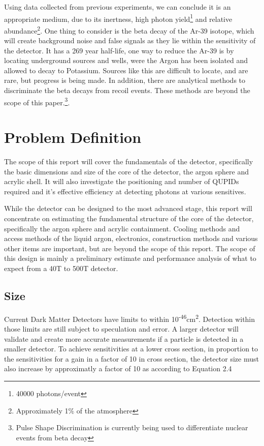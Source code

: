 \documentclass[11pt,a4paper,oneside]{report}
\begin{document}
Using data collected from previous experiments, we can conclude it is an appropriate medium, due to its inertness, high photon yield\footnote{40000 photons/event} and relative abundance\cite{16}\footnote{Approximately 1$\%$ of the atmosphere}. One thing to consider is the beta decay of the Ar-39 isotope, which will create background noise and false signals as they lie within the sensitivity of the detector. It has a 269 year half-life, one way to reduce the Ar-39 is by locating underground sources and wells, were the Argon has been isolated and allowed to decay to Potassium\cite{17}. Sources like this are difficult to locate, and are rare, but progress is being made. In addition, there are analytical methods to discriminate the beta decays from recoil events. These methods are beyond the scope of this paper.\footnote{Pulse Shape Discrimination is currently being used to differentiate nuclear events from beta decay}.


\newpage
\chapter{Problem Definition}

The scope of this report will cover the fundamentals of the detector, specifically the basic dimensions and size of the core of the detector, the argon sphere and acrylic shell. It will also investigate the positioning and number of QUPIDs required and it's effective efficiency at detecting photons at various sensitives.

While the detector can be designed to the most advanced stage, this report will concentrate on estimating the fundamental structure of the core of the detector, specifically the argon sphere and acrylic containment. Cooling methods and access methods of the liquid argon, electronics, construction methods and various other items are important, but are beyond the scope of this report. The scope of this design is mainly a preliminary estimate and performance analysis of what to expect from a 40T to 500T detector.

\section{Size}
Current Dark Matter Detectors have limits to within 10\textsuperscript{-46}cm\textsuperscript{2}. Detection within those limits are still subject to speculation and error. A larger detector will validate and create more accurate measurements if a particle is detected in a smaller detector. To achieve sensitivities at a lower cross section, in proportion to the sensitivities for a gain in a factor of 10 in cross section, the detector size must also increase by approximatly a factor of 10 as according to Equation 2.4
\end{document}
